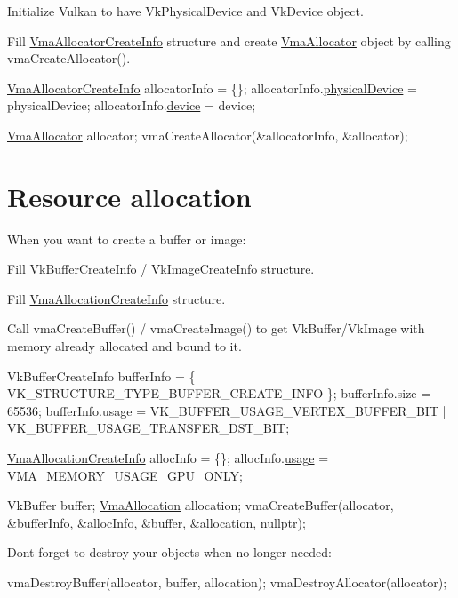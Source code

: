 \begin{DoxyEnumerate}
\item Initialize Vulkan to have {\ttfamily Vk\+Physical\+Device} and {\ttfamily Vk\+Device} object.
\item Fill \hyperlink{structVmaAllocatorCreateInfo}{Vma\+Allocator\+Create\+Info} structure and create \hyperlink{structVmaAllocator}{Vma\+Allocator} object by calling vma\+Create\+Allocator().
\end{DoxyEnumerate}


\begin{DoxyCode}
\hyperlink{structVmaAllocatorCreateInfo}{VmaAllocatorCreateInfo} allocatorInfo = \{\};
allocatorInfo.\hyperlink{structVmaAllocatorCreateInfo_a08230f04ae6ccf8a78150a9e829a7156}{physicalDevice} = physicalDevice;
allocatorInfo.\hyperlink{structVmaAllocatorCreateInfo_ad924ddd77b04039c88d0c09b0ffcd500}{device} = device;

\hyperlink{structVmaAllocator}{VmaAllocator} allocator;
vmaCreateAllocator(&allocatorInfo, &allocator);
\end{DoxyCode}
\hypertarget{quick_start_quick_start_resource_allocation}{}\section{Resource allocation}\label{quick_start_quick_start_resource_allocation}
When you want to create a buffer or image\+:


\begin{DoxyEnumerate}
\item Fill {\ttfamily Vk\+Buffer\+Create\+Info} / {\ttfamily Vk\+Image\+Create\+Info} structure.
\item Fill \hyperlink{structVmaAllocationCreateInfo}{Vma\+Allocation\+Create\+Info} structure.
\item Call vma\+Create\+Buffer() / vma\+Create\+Image() to get {\ttfamily Vk\+Buffer}/{\ttfamily Vk\+Image} with memory already allocated and bound to it.
\end{DoxyEnumerate}


\begin{DoxyCode}
VkBufferCreateInfo bufferInfo = \{ VK\_STRUCTURE\_TYPE\_BUFFER\_CREATE\_INFO \};
bufferInfo.size = 65536;
bufferInfo.usage = VK\_BUFFER\_USAGE\_VERTEX\_BUFFER\_BIT | VK\_BUFFER\_USAGE\_TRANSFER\_DST\_BIT;

\hyperlink{structVmaAllocationCreateInfo}{VmaAllocationCreateInfo} allocInfo = \{\};
allocInfo.\hyperlink{structVmaAllocationCreateInfo_accb8b06b1f677d858cb9af20705fa910}{usage} = VMA\_MEMORY\_USAGE\_GPU\_ONLY;

VkBuffer buffer;
\hyperlink{structVmaAllocation}{VmaAllocation} allocation;
vmaCreateBuffer(allocator, &bufferInfo, &allocInfo, &buffer, &allocation, \textcolor{keyword}{nullptr});
\end{DoxyCode}


Don\textquotesingle{}t forget to destroy your objects when no longer needed\+:


\begin{DoxyCode}
vmaDestroyBuffer(allocator, buffer, allocation);
vmaDestroyAllocator(allocator);
\end{DoxyCode}
 